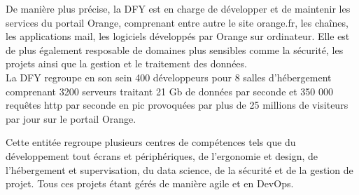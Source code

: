 De manière plus précise, la DFY est en charge de développer et de maintenir les services du portail Orange, comprenant entre autre le site orange.fr, les chaînes, les applications mail,  les logiciels développés par Orange sur ordinateur.
Elle est de plus également resposable de domaines plus sensibles comme la sécurité, les projets ainsi que la gestion et le traitement des données.\\

La DFY regroupe en son sein 400 développeurs pour 8 salles d’hébergement comprenant 3200 serveurs traitant 21 Gb de données par seconde et 350 000 requêtes http par seconde en pic provoquées par plus de 25 millions de visiteurs par jour sur le portail Orange.

Cette entitée regroupe plusieurs centres de compétences tels que du développement tout écrans et périphériques, de l'ergonomie et design, de l'hébergement et supervisation, du data science, de la sécurité et de la gestion de projet. Tous ces projets étant gérés de manière agile et en DevOps. 

